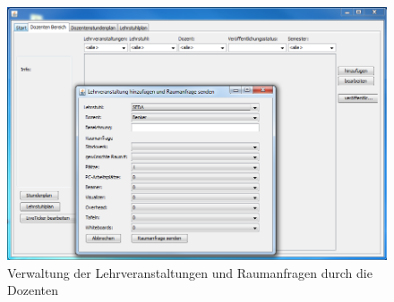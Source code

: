 \begin{figure}[H]
\begin{center}
\includegraphics[width=170mm]{images/section_7/DozentenLehrveranstaltungeURaumanfrage.PNG}
\caption{Verwaltung der Lehrveranstaltungen und Raumanfragen durch die Dozenten}
\label{img:LehrveranstaltungsVerwDoz}
\end{center}
\end{figure}

